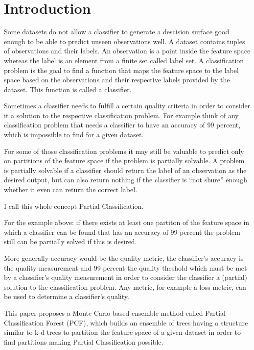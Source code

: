\section{Introduction}

Some datasets do not allow a classifier to generate a
descision surface good enough to be able to predict unseen
observations well. A dataset contains tuples of
observations and their labels. An observation is a point
inside the feature space whereas the label is an element
from a finite set called label set. A classification
problem is the goal to find a function that maps the
feature space to the label space based on the observations
and their respective labels provided by the dataset.%
\cite[chapter 18]{ki} This function is called a classifier.

Sometimes a classifier needs to fulfill a certain quality
criteria in order to consider it a solution to the
respective classification problem. For example think of any
classification problem that needs a classifier to have an
accuracy of 99 percent, which is impossible to find for a
given dataset.

For some of those classification problems it may still be
valuable to predict only on partitions of the feature
space if the problem is partially solvable. A problem is
partially solvable if a classifier should return the label
of an observation as the desired output, but can also
return nothing if the classifier is ``not shure'' enough
whether it even can return the correct label.

I call this whole concept Partial Classification.

For the example above: if there exists at least one
partiton of the feature space in which a classifier can be
found that has an accuracy of 99 percent the problem still
can be partially solved if this is desired.

More generally accuracy would be the quality metric,
the classifier's accuracy is the quality measurement and 99
percent the quality theshold which must be met by a
classifier's quality measurement in order to consider the
classifier a (partial) solution to the classification
problem. Any metric, for example a loss metric, can be used
to determine a classifier's quality.

This paper proposes a Monte Carlo based ensemble method
called Partial Classification Forest (PCF), which builds an
ensemble of trees having a structure similar to
k-d trees to partition the feature space of a given dataset
in order to find partitions making Partial Classification
possible.

